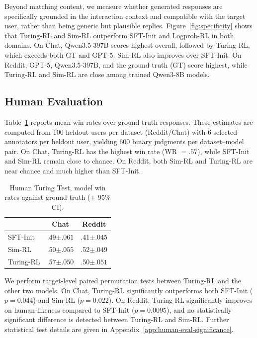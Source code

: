 \documentclass{article} %
\newcommand{\subtle}[1]{{\tiny\color[gray]{0.4}#1}}
\begin{document}
Beyond matching content, we measure whether generated responses are specifically grounded in the interaction context and compatible with the target user, rather than being generic but plausible replies. Figure~\ref{fig:specificity} shows that Turing-RL and Sim-RL outperform SFT-Init and Logprob-RL in both domains.
On Chat, Qwen3.5-397B scores highest overall, followed by Turing-RL, which exceeds both GT and GPT-5. Sim-RL also improves over SFT-Init. On Reddit, GPT-5, Qwen3.5-397B, and the ground truth (GT) score highest, while Turing-RL and Sim-RL are close among trained Qwen3-8B models. 

\subsection{Human Evaluation}


Table~\ref{tab:human_eval_winrate} reports mean win rates over ground truth responses. These estimates are computed from 100 heldout users per dataset (Reddit/Chat) with 6 selected annotators per heldout user, yielding 600 binary judgments per dataset--model pair.  On Chat, Turing-RL has the highest win rate (WR $= .57$), while SFT-Init and Sim-RL remain close to chance. On Reddit, both Sim-RL and Turing-RL are near chance and much higher than SFT-Init. 

\begin{table}
\vspace{-3mm}
\centering
\small
\setlength{\tabcolsep}{0pt}
\begin{tabular*}{0.75\linewidth}{@{\extracolsep{\fill}}lcc@{}}
\toprule
 & \textbf{Chat} & \textbf{Reddit} \\
\midrule
SFT-Init    & .49\subtle{$\pm.061$} & .41\subtle{$\pm.045$} \\
Sim-RL    & .50\subtle{$\pm.055$} & .52\subtle{$\pm.049$} \\
Turing-RL & .57\subtle{$\pm.050$} & {.50\subtle{$\pm.051$}} \\
\bottomrule
\end{tabular*}
\vspace{-2mm}
\caption{Human Turing Test, model win rates against ground truth ($\pm$ 95\% CI).}
\vspace{4mm}
\label{tab:human_eval_winrate}
\end{table}

We perform target-level paired permutation tests between Turing-RL and the other two models. On Chat, Turing-RL significantly outperforms both SFT-Init ($p=0.044$) and Sim-RL ($p=0.022$). On Reddit, Turing-RL significantly improves on human-likeness compared to SFT-Init ($p=0.0095$), and no statistically significant difference is detected between Turing-RL and Sim-RL. Further statistical test details are given in Appendix~\ref{app:human-eval-significance}. 
\end{document}
